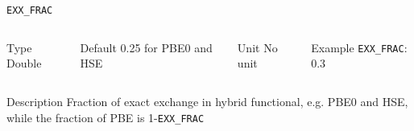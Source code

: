    \begin{frame}[allowframebreaks]{\texttt{EXX\_FRAC}} \label{EXX_FRAC}
    \vspace*{-12pt}
    \begin{columns}
    \begin{block}{Type}
    Double
    \end{block}
    
    \begin{block}{Default}
    0.25 for PBE0 and HSE
    \end{block}
    
    \begin{block}{Unit}
    No unit
    \end{block}
    
    \begin{block}{Example}
    \texttt{EXX\_FRAC}: 0.3
    \end{block}
    \end{columns}
    
    \begin{block}{Description}
    Fraction of exact exchange in hybrid functional, e.g. PBE0 and HSE, while the fraction of PBE is 1-\texttt{EXX\_FRAC}
    \end{block}
    
    \end{frame}
    

